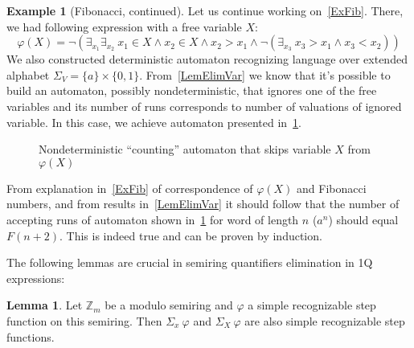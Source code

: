 \documentclass[12pt]{article}
\theoremstyle{definition}
\newtheorem{lemma}[theorem]{Lemma}
\newtheorem{example}{Example}[section]
\begin{document}
\begin{example}[Fibonacci, continued]
\label{ExFibCont}
    Let us continue working on~\cref{ExFib}. There, we had following expression with a free variable $X$:
    $$\varphi(X) = \neg(\exists_{x_1}\exists_{x_2} \ x_1 \in X \land x_2 \in X \land x_2 > x_1 \land \neg(\exists_{x_3} \ x_3 > x_1 \land x_3 < x_2 ))$$
    We also constructed deterministic automaton recognizing language over extended alphabet $\Sigma_V = \{a\} \times \{0,1\}$. From~\cref{LemElimVar} we know that it's possible to build an automaton, possibly nondeterministic, that ignores one of the free variables and its number of runs corresponds to number of valuations of ignored variable. In this case, we achieve automaton presented in~\cref{fig:my_label2}.

    \begin{figure}[ht]
        \centering
        \caption{Nondeterministic ``counting'' automaton that skips variable $X$ from $\varphi(X)$}
        \label{fig:my_label2}
    \end{figure}

    From explanation in~\cref{ExFib} of correspondence of $\varphi(X)$ and Fibonacci numbers, and from results in~\cref{LemElimVar} it should follow that the number of accepting runs of automaton shown in~\cref{fig:my_label2} for word of length $n$ ($a^n$) should equal $F(n+2)$. This is indeed true and can be proven by induction.
\end{example}

The following lemmas are crucial in semiring quantifiers elimination in 1Q expressions:

\begin{lemma}
    \label{QuantElimAdd}
    Let $\mathbb{Z}_m$ be a modulo semiring and $\varphi$ a simple recognizable step function on this semiring. Then $\Sigma_x \ \varphi$ and $\Sigma_X \ \varphi$ are also simple recognizable step functions.
\end{lemma}
\end{document}
